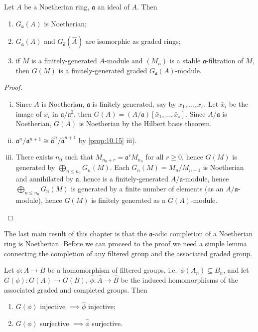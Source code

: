 \begin{proposition}\label{prop:10.22}
Let $A$ be a Noetherian ring, $\mathfrak{a}$ an ideal of $A$. Then
\begin{enumerate}
    \item[i)] $G_{\mathfrak{a}}(A)$ is Noetherian;
    \item[ii)] $G_{\mathfrak{a}}(A)$ and $G_{\hat{\mathfrak{a}}}(\hat{A})$ are isomorphic as graded rings;
    \item[iii)] if $M$ is a finitely-generated $A$-module and $(M_n)$ is a stable $\mathfrak{a}$-filtration of $M$, then $G(M)$ is a finitely-generated graded $G_{\mathfrak{a}}(A)$-module.
\end{enumerate}
\end{proposition}
\begin{proof}
    \begin{enumerate}[i)]
        \item Since $A$ is Noetherian, $\mathfrak{a}$ is finitely generated, say by $x_1, \ldots, x_s$. Let $\bar{x}_i$ be the image of $x_i$ in $\mathfrak{a}/\mathfrak{a}^2$, then $G(A) = (A/\mathfrak{a})[\bar{x}_1, \ldots, \bar{x}_s]$. Since $A/\mathfrak{a}$ is Noetherian, $G(A)$ is Noetherian by the Hilbert basis theorem.
        \item $\mathfrak{a}^n/\mathfrak{a}^{n+1} \cong \hat{\mathfrak{a}}^n/\hat{\mathfrak{a}}^{n+1}$ by \eqref{prop:10.15} iii).
        \item There exists $n_0$ such that $M_{n_0+r} = \mathfrak{a}^r M_{n_0}$ for all $r \ge 0$, hence $G(M)$ is generated by $\bigoplus_{n \le n_0} G_n(M)$. Each $G_n(M) = M_n/M_{n+1}$ is Noetherian and annihilated by $\mathfrak{a}$, hence is a finitely-generated $A/\mathfrak{a}$-module, hence $\bigoplus_{n \le n_0} G_n(M)$ is generated by a finite number of elements (as an $A/\mathfrak{a}$-module), hence $G(M)$ is finitely generated as a $G(A)$-module.
    \end{enumerate}
\end{proof}

The last main result of this chapter is that the $\mathfrak{a}$-adic completion of a Noetherian ring is Noetherian. Before we can proceed to the proof we need a simple lemma connecting the completion of any filtered group and the associated graded group.

\begin{lemma}\label{lem:completion-graded-injective-surjective}
    Let $\phi: A \to B$ be a homomorphism of filtered groups, i.e.\ $\phi(A_n) \subseteq B_n$, and let $G(\phi): G(A) \to G(B)$, $\hat{\phi}: \hat{A} \to \hat{B}$ be the induced homomorphisms of the associated graded and completed groups. Then
    \begin{enumerate}
        \item[i)] $G(\phi)$ injective $\implies \hat{\phi}$ injective;
        \item[ii)] $G(\phi)$ surjective $\implies \hat{\phi}$ surjective.
    \end{enumerate}
\end{lemma}

